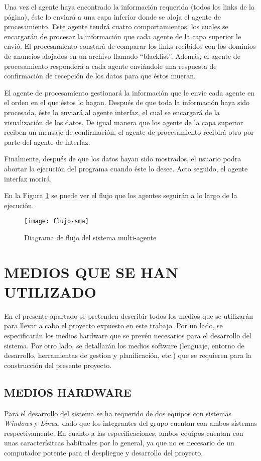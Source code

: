 \documentclass{pre-tfg}
\begin{document}
Una vez el agente haya encontrado la información requerida (todos los links de la página), éste lo enviará a una capa inferior donde se aloja el agente de procesamiento. Este agente tendrá cuatro comportamientos, los cuales se encargarán de procesar la información que cada agente de la capa superior le envió. El procesamiento constará de comparar los links recibidos con los dominios de anuncios alojados en un archivo llamado ``blacklist''. Además, el agente de procesamiento responderá a cada agente enviándole una respuesta de confirmación de recepción de los datos para que éstos mueran.

El agente de procesamiento gestionará la información que le envíe cada agente en el orden en el que éstos lo hagan. Después de que toda la información haya sido procesada, éste lo enviará al agente interfaz, el cual se encargará de la visualización de los datos. De igual manera que los agente de la capa superior reciben un mensaje de confirmación, el agente de procesamiento recibirá otro por parte del agente de interfaz. 

Finalmente, después de que los datos hayan sido mostrados, el usuario podra abortar la ejecución del programa cuando éste lo desee. Acto seguido, el agente interfaz morirá.

En la Figura \ref{fig:flujo-sma} se puede ver el flujo que los agentes seguirán a lo largo de la ejecución.

\begin{figure}[h]
    \centering
    \texttt{[image: flujo-sma]}
    \caption{Diagrama de flujo del sistema multi-agente}
    \label{fig:flujo-sma}
\end{figure}

\clearpage

\section{MEDIOS QUE SE HAN UTILIZADO}
En el presente apartado se pretenden describir todos los medios que se utilizarán para llevar a cabo el proyecto
expuesto en este trabajo. Por un lado, se especificarán los medios hardware que se prevén necesarios para el desarrollo
del sistema. Por otro lado, se detallarán los medios software (lenguaje, entorno de desarrollo, herramientas de gestion y 
planificación, etc.) que se requieren para la construcción del presente proyecto.

\subsection{MEDIOS HARDWARE}
Para el desarrollo del sistema se ha requerido de dos equipos con sistemas \textit{Windows} y \textit{Linux}, dado
que los integrantes del grupo cuentan con ambos sistemas respectivamente. En cuanto a las especificaciones, ambos equipos
cuentan con unas caracterísitcas habituales por lo general, ya que no es necesario de un computador potente para el despliegue y desarrollo del
proyecto.
\end{document}
